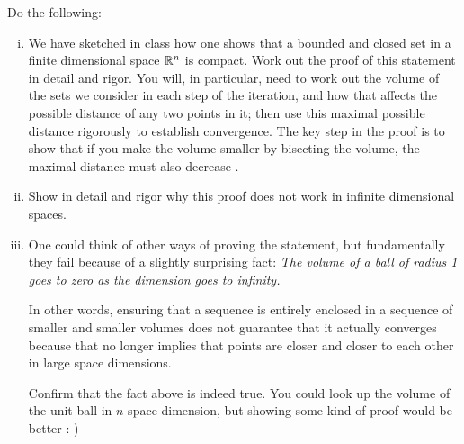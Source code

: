 \documentclass[12pt]{memoir}
\begin{document}
\begin{Ej}[Compactness]
    Do the following:
    \begin{enumerate}[i)]
        \itemsep=-0.4em
        \item We have sketched in class how one shows that a bounded and closed set in a finite dimensional space
        $\mathbb{R}^n$ is compact.  Work out the proof of this statement in detail and rigor. You
        will, in particular, need to work out the volume of the sets we consider in each step of the iteration, and
        how that affects the possible distance of any two points in it; then use this maximal possible distance
        rigorously to establish convergence. The key step in the proof is to show that if you make the volume
        smaller by bisecting the volume, the maximal distance must also decrease .
        \item Show in detail and rigor why this proof does not work in infinite dimensional spaces.
        \item One could think of other ways of proving the statement, but fundamentally they fail because of a
        slightly surprising fact: \emph{The volume of a ball of radius 1 goes to zero as the dimension goes to infinity.}\par
        In other words, ensuring that a sequence is entirely enclosed in a sequence of smaller and smaller
        volumes does not guarantee that it actually converges because that no longer implies that points are
        closer and closer to each other in large space dimensions.\par
        Confirm that the fact above is indeed true. You could look up the volume of the unit ball in $n$ space
dimension, but showing some kind of proof would be better :-)
    \end{enumerate}
\end{Ej}
\end{document}
